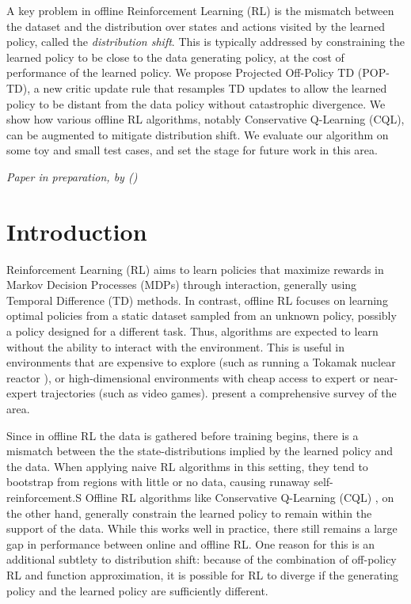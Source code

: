 

A key problem in offline Reinforcement Learning (RL) is the mismatch between the dataset and the distribution over states and actions visited by the learned policy, called the \emph{distribution shift}. This is typically addressed by constraining the learned policy to be close to the data generating policy, at the cost of performance of the learned policy. We propose Projected Off-Policy TD (POP-TD), a new critic update rule that resamples TD updates to allow the learned policy to be distant from the data policy without catastrophic divergence. We show how various offline RL algorithms, notably Conservative Q-Learning (CQL), can be augmented to mitigate distribution shift. We evaluate our algorithm on some toy and small test cases, and set the stage for future work in this area.

\emph{Paper in preparation, by \citeauthor{manek2023poptd} (\citeyear{manek2023poptd})}

\clearpage


\section{Introduction}

Reinforcement Learning (RL) aims to learn policies that maximize rewards in Markov Decision Processes (MDPs) through interaction, generally using Temporal Difference (TD) methods. In contrast, offline RL focuses on learning optimal policies from a static dataset sampled from an unknown policy, possibly a policy designed for a different task. Thus, algorithms are expected to learn without the ability to interact with the environment.
This is useful in environments that are expensive to explore (such as running a Tokamak nuclear reactor \cite{degrave2022magnetic}), or high-dimensional environments with cheap access to expert or near-expert trajectories (such as video games). \citet{levine2020survey} present a comprehensive survey of the area.

Since in offline RL the data is gathered before training begins, there is a mismatch between the the state-distributions implied by the learned policy and the data.
When applying naive RL algorithms in this setting, they tend to bootstrap from regions with little or no data, causing runaway self-reinforcement.S
Offline RL algorithms like Conservative Q-Learning (CQL) \cite{kumar2020cql}, on the other hand, generally constrain the learned policy to remain within the support of the data. While this works well in practice, there still remains a large gap in performance between online and offline RL. One reason for this is an additional subtlety to distribution shift: because of the combination of off-policy RL and function approximation, it is possible for RL to diverge if the generating policy and the learned policy are sufficiently different.


